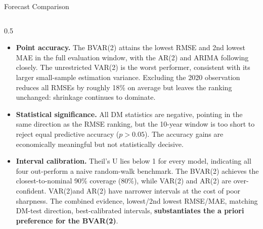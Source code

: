 \documentclass[9pt]{beamer}
\begin{document}
\begin{frame}{Forecast Comparison}
\begin{columns}
  \begin{column}{0.5\textwidth}
    \scriptsize
    \begin{itemize}
      \item \textbf{Point accuracy.} The BVAR(2) attains the lowest RMSE and 2nd lowest MAE in the full evaluation window, with the AR(2) and ARIMA following closely. The unrestricted VAR(2) is the worst performer, consistent with its larger small-sample estimation variance. Excluding the 2020 observation reduces all RMSEs by roughly 18\% on average but leaves the ranking unchanged: shrinkage continues to dominate.

      \item \textbf{Statistical significance.} All DM statistics are negative, pointing in the same direction as the RMSE ranking, but the 10-year window is too short to reject equal predictive accuracy ($p > 0.05$). The accuracy gains are economically meaningful but not statistically decisive.

      \item \textbf{Interval calibration.} Theil's U lies below 1 for every model, indicating all four out-perform a naive random-walk benchmark. The BVAR(2) achieves the closest-to-nominal 90\% coverage (80\%), while VAR(2) and AR(2) are over-confident. VAR(2)and AR(2) have narrower intervals at the cost of poor sharpness. The combined evidence, lowest/2nd lowest RMSE/MAE, matching DM-test direction, best-calibrated intervals, \textbf{substantiates the a priori preference for the BVAR(2)}.
    \end{itemize}
  \end{column}
\end{columns}

\end{frame}
\end{document}
